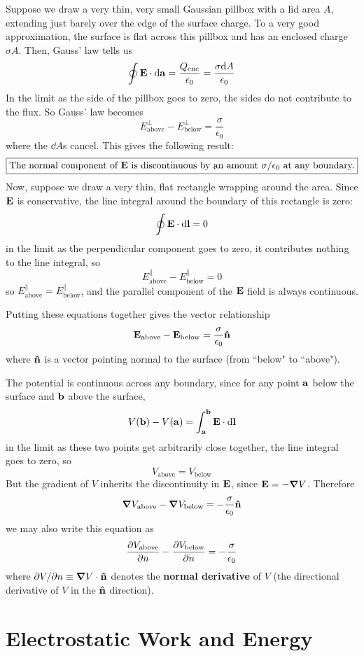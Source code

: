 Suppose we draw a very thin, very small Gaussian pillbox with a lid area $A$, extending just barely over the edge of the surface charge. To a very good approximation, the surface is flat across this pillbox and has an enclosed charge $\sigma A$. Then, Gauss' law tells us
\[ \oint \mathbf{E} \cdot\dd \mathbf{a} = \frac{Q_\text{enc}}{\epsilon_0} = \frac{\sigma \dd A}{\epsilon_0} \]
In the limit as the side of the pillbox goes to zero, the sides do not contribute to the flux. So Gauss' law becomes
\[  E_\text{above}^\perp - E_\text{below}^\perp = \frac{\sigma}{\epsilon_0}\]
where the $\dd A$s cancel. This gives the following result:
\[ \boxed{\text{The normal component of $\mathbf{E}$ is discontinuous by an amount $\sigma/\epsilon_0$ at any boundary.}} \]
Now, suppose we draw a very thin, flat rectangle wrapping around the area. Since $\mathbf{E}$ is conservative, the line integral around the boundary of this rectangle is zero:
\[ \oint  \mathbf{E} \cdot \dd \mathbf{l} = 0\]
in the limit as the perpendicular component goes to zero, it contributes nothing to the line integral, so
\[ E_\text{above}^\parallel - E_\text{below}^\parallel = 0\]
so $E_\text{above}^\parallel = E_\text{below}^\parallel$, and the parallel component of the $\mathbf{E}$ field is always continuous. 

Putting these equations together gives the vector relationship
\[ \mathbf{E}_\text{above}- \mathbf{E}_\text{below} = \frac{\sigma}{\epsilon_0}\mathbf{\hat n} \]
where $\mathbf{\hat n}$ is a vector pointing normal to the surface (from ``below" to ``above").

The potential is continuous across any boundary, since for any point $\mathbf{a}$ below the surface and $\mathbf{b}$ above the surface,
\[ V(\mathbf{b}) - V(\mathbf{a}) = \int_{\mathbf{a}}^{\mathbf{b}} \mathbf{E} \cdot \dd \mathbf{l}\]
in the limit as these two points get arbitrarily close together, the line integral goes to zero, so
\[ V_\text{above} = V_\text{below} \]
But the gradient of $V$ inherits the discontinuity in $\mathbf{E}$, since $\mathbf{E} = -\grad V$. Therefore
\[ \grad V_\text{above} - \grad V_\text{below} = -\frac{\sigma}{\epsilon_0}\mathbf{\hat n}\]
we may also write this equation as
\[ \pdv{V_\text{above}}{n} - \pdv{V_\text{below}}{n} = -\frac{\sigma}{\epsilon_0} \]
where $\partial V/\partial n \equiv \grad V \cdot \mathbf{\hat n}$ denotes the \textbf{normal derivative} of $V$ (the directional derivative of $V$ in the $\mathbf{\hat n}$ direction).
\section{Electrostatic Work and Energy}